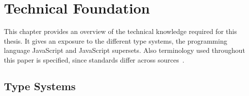 \chapter{Technical Foundation}
\label{cha:technical-foundation}

This chapter provides an overview of the technical knowledge required for this thesis. It gives an exposure to the different type systems, the programming language JavaScript and JavaScript supersets. Also terminology used throughout this paper is specified, since standards differ across sources~\cite[p.~97-1]{TypeSystems:Cardelli:2004}.

\section{Type Systems}
\label{sec:type-systems}

